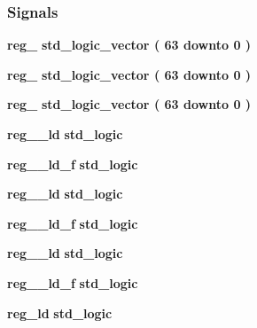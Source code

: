 \subsubsection*{Signals}
 \begin{DoxyCompactItemize}
\item 
{\bf reg\+\_} {\bfseries \textcolor{comment}{std\+\_\+logic\+\_\+vector}\textcolor{vhdlchar}{ }\textcolor{vhdlchar}{(}\textcolor{vhdlchar}{ }\textcolor{vhdlchar}{ } \textcolor{vhdldigit}{63} \textcolor{vhdlchar}{ }\textcolor{keywordflow}{downto}\textcolor{vhdlchar}{ }\textcolor{vhdlchar}{ } \textcolor{vhdldigit}{0} \textcolor{vhdlchar}{ }\textcolor{vhdlchar}{)}\textcolor{vhdlchar}{ }} 
\item 
{\bf reg\+\_} {\bfseries \textcolor{comment}{std\+\_\+logic\+\_\+vector}\textcolor{vhdlchar}{ }\textcolor{vhdlchar}{(}\textcolor{vhdlchar}{ }\textcolor{vhdlchar}{ } \textcolor{vhdldigit}{63} \textcolor{vhdlchar}{ }\textcolor{keywordflow}{downto}\textcolor{vhdlchar}{ }\textcolor{vhdlchar}{ } \textcolor{vhdldigit}{0} \textcolor{vhdlchar}{ }\textcolor{vhdlchar}{)}\textcolor{vhdlchar}{ }} 
\item 
{\bf reg\+\_} {\bfseries \textcolor{comment}{std\+\_\+logic\+\_\+vector}\textcolor{vhdlchar}{ }\textcolor{vhdlchar}{(}\textcolor{vhdlchar}{ }\textcolor{vhdlchar}{ } \textcolor{vhdldigit}{63} \textcolor{vhdlchar}{ }\textcolor{keywordflow}{downto}\textcolor{vhdlchar}{ }\textcolor{vhdlchar}{ } \textcolor{vhdldigit}{0} \textcolor{vhdlchar}{ }\textcolor{vhdlchar}{)}\textcolor{vhdlchar}{ }} 
\item 
{\bf reg\+\_\+\_\+ld} {\bfseries \textcolor{comment}{std\+\_\+logic}\textcolor{vhdlchar}{ }} 
\item 
{\bf reg\+\_\+\_\+ld\+\_\+f} {\bfseries \textcolor{comment}{std\+\_\+logic}\textcolor{vhdlchar}{ }} 
\item 
{\bf reg\+\_\+\_\+ld} {\bfseries \textcolor{comment}{std\+\_\+logic}\textcolor{vhdlchar}{ }} 
\item 
{\bf reg\+\_\+\_\+ld\+\_\+f} {\bfseries \textcolor{comment}{std\+\_\+logic}\textcolor{vhdlchar}{ }} 
\item 
{\bf reg\+\_\+\_\+ld} {\bfseries \textcolor{comment}{std\+\_\+logic}\textcolor{vhdlchar}{ }} 
\item 
{\bf reg\+\_\+\_\+ld\+\_\+f} {\bfseries \textcolor{comment}{std\+\_\+logic}\textcolor{vhdlchar}{ }} 
\item 
{\bf reg\+\_\+ld} {\bfseries \textcolor{comment}{std\+\_\+logic}\textcolor{vhdlchar}{ }} 
\item 

\end{DoxyCompactItemize}
